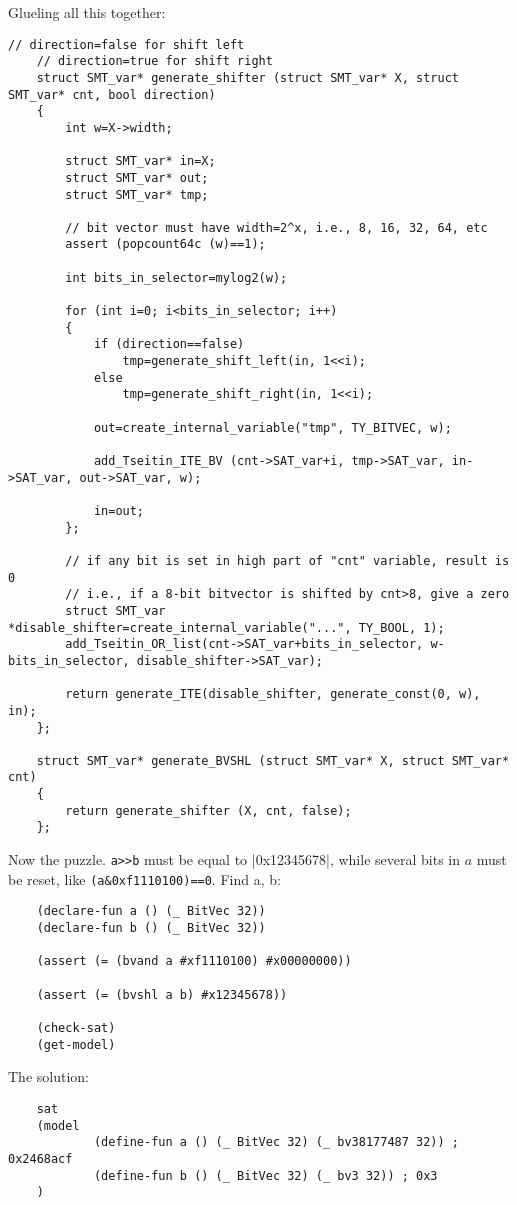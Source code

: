 Glueling all this together:

\begin{lstlisting}[style=customc]
	// direction=false for shift left
	// direction=true for shift right
	struct SMT_var* generate_shifter (struct SMT_var* X, struct SMT_var* cnt, bool direction)
	{
		int w=X->width;

		struct SMT_var* in=X;
		struct SMT_var* out;
		struct SMT_var* tmp;

		// bit vector must have width=2^x, i.e., 8, 16, 32, 64, etc
		assert (popcount64c (w)==1);

		int bits_in_selector=mylog2(w);

		for (int i=0; i<bits_in_selector; i++)
		{
			if (direction==false)
				tmp=generate_shift_left(in, 1<<i);
			else
				tmp=generate_shift_right(in, 1<<i);

			out=create_internal_variable("tmp", TY_BITVEC, w);

			add_Tseitin_ITE_BV (cnt->SAT_var+i, tmp->SAT_var, in->SAT_var, out->SAT_var, w);

			in=out;
		};

		// if any bit is set in high part of "cnt" variable, result is 0
		// i.e., if a 8-bit bitvector is shifted by cnt>8, give a zero
		struct SMT_var *disable_shifter=create_internal_variable("...", TY_BOOL, 1);
		add_Tseitin_OR_list(cnt->SAT_var+bits_in_selector, w-bits_in_selector, disable_shifter->SAT_var);

		return generate_ITE(disable_shifter, generate_const(0, w), in);
	};

	struct SMT_var* generate_BVSHL (struct SMT_var* X, struct SMT_var* cnt)
	{
		return generate_shifter (X, cnt, false);
	};
\end{lstlisting}

Now the puzzle.
\verb|a>>b| must be equal to |0x12345678|, while several bits in $a$ must be reset, like \verb|(a&0xf1110100)==0|.  Find a, b:

\begin{lstlisting}
	(declare-fun a () (_ BitVec 32))
	(declare-fun b () (_ BitVec 32))

	(assert (= (bvand a #xf1110100) #x00000000))

	(assert (= (bvshl a b) #x12345678))

	(check-sat)
	(get-model)
\end{lstlisting}

The solution:

\begin{lstlisting}
	sat
	(model
	        (define-fun a () (_ BitVec 32) (_ bv38177487 32)) ; 0x2468acf
        	(define-fun b () (_ BitVec 32) (_ bv3 32)) ; 0x3
	)
\end{lstlisting}

